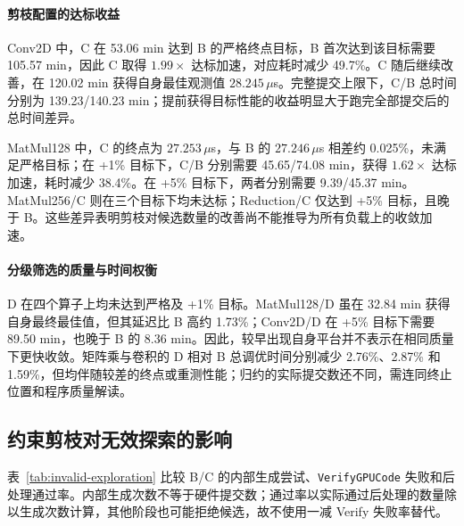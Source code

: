 \begin{table}[t]
\centering
\caption{全部运行的收敛位置与统一目标时间，单位为 min。自身最佳位置取完整反馈后的批末；严格、+1\%、+5\% 目标均相对于同算子 B 的搜索终点。NR 表示截至本行总调优时间仍未达到目标。}
\label{tab:operator800-convergence}
\small
\setlength{\tabcolsep}{4pt}

\end{table}

\paragraph{剪枝配置的达标收益}
Conv2D 中，C 在 53.06 min 达到 B 的严格终点目标，B 首次达到该目标需要 105.57 min，因此 C 取得 $1.99\times$ 达标加速，对应耗时减少 49.7\%。C 随后继续改善，在 120.02 min 获得自身最佳观测值 $28.245\,\mu$s。完整提交上限下，C/B 总时间分别为 139.23/140.23 min；提前获得目标性能的收益明显大于跑完全部提交后的总时间差异。

MatMul128 中，C 的终点为 $27.253\,\mu$s，与 B 的 $27.246\,\mu$s 相差约 0.025\%，未满足严格目标；在 +1\% 目标下，C/B 分别需要 45.65/74.08 min，获得 $1.62\times$ 达标加速，耗时减少 38.4\%。在 +5\% 目标下，两者分别需要 9.39/45.37 min。MatMul256/C 则在三个目标下均未达标；Reduction/C 仅达到 +5\% 目标，且晚于 B。这些差异表明剪枝对候选数量的改善尚不能推导为所有负载上的收敛加速。

\paragraph{分级筛选的质量与时间权衡}
D 在四个算子上均未达到严格及 +1\% 目标。MatMul128/D 虽在 32.84 min 获得自身最终最佳值，但其延迟比 B 高约 1.73\%；Conv2D/D 在 +5\% 目标下需要 89.50 min，也晚于 B 的 8.36 min。因此，较早出现自身平台并不表示在相同质量下更快收敛。矩阵乘与卷积的 D 相对 B 总调优时间分别减少 2.76\%、2.87\% 和 1.59\%，但均伴随较差的终点或重测性能；归约的实际提交数还不同，需连同终止位置和程序质量解读。

\FloatBarrier
\subsection{约束剪枝对无效探索的影响}
\label{sec:invalid-exploration}
表~\ref{tab:invalid-exploration} 比较 B/C 的内部生成尝试、\texttt{VerifyGPUCode} 失败和后处理通过率。内部生成次数不等于硬件提交数；通过率以实际通过后处理的数量除以生成次数计算，其他阶段也可能拒绝候选，故不使用一减 Verify 失败率替代。

\begin{table}[t]
\centering
\caption{约束剪枝对内部候选的影响。每种配置依次列出生成数、Verify 失败数及后处理通过率。$\dagger$：Conv2D/C 为接续运行，原生内部计数包含状态重建期间的工作，不能视为与活动 Tune 时间严格对齐的增量计数。}
\label{tab:invalid-exploration}
\small
\setlength{\tabcolsep}{4pt}

\end{table}

